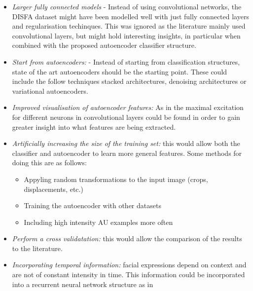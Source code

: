     \begin{itemize}
      \item \textit{Larger fully connected models} - Instead of using convolutional networks, the DISFA dataset might have been
                                                     modelled well with just fully connected layers and regularisation techinques.
                                                     This was ignored as the literature mainly used convolutional layers, but might hold
                                                     interesting insights, in particular when combined with the proposed autoencoder classifier structure.
      \item \textit{Start from autoencoders:} -
            Instead of starting from classification structures, state of the art autoencoders
            should be the starting point. These could include the follow techniques stacked architectures\cite{Zhou2014}, denoising architectures\cite{stacks,Vincent2008a} or variational autoencoders\cite{Kingma2013}.
      \item \textit{Improved visualisation of autoencoder features:} As in \cite{Khorrami2015} the maximal excitation for different neurons in convolutional layers
              could be found in order to gain greater insight into what features are being extracted.
      \item \textit{  Artificially increasing the size of the training set:}
            this would allow both the classifier and autoencoder to learn more
            general features. Some methods for doing this are as follows:

            \begin{itemize}
              \item Appyling random transformations to the input image (crops, displacements, etc.)
              \item Training the autoencoder with other datasets
              \item Including high intensity AU examples more often
            \end{itemize}
      \item \textit{ Perform a cross validatation:} this would allow the comparison of the results to the literature.
      \item \textit{ Incorporating temporal information:} facial expressions depend on context
            and are not of constant intensity in time. This information could be incorporated into
            a recurrent neural network structure as in \cite{Jaiswal2016}
    \end{itemize}

